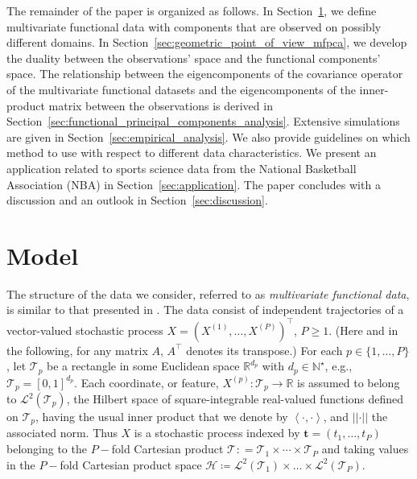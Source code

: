 \documentclass[times,sort&compress,3p]{elsarticle}
\theoremstyle{plain}%
\theoremstyle{definition}
\newcommand{\RR}{\mathbb{R}} %
\newcommand{\NN}{\mathbb{N}} %
\newcommand{\TT}[1]{\mathcal{T}_{#1}} %
\newcommand{\sLp}[1]{\mathcal{L}^{2}(#1)} %
\newcommand{\HH}{\mathcal{H}} %
\newcommand{\pointt}{\mathbf{t}} %
\newcommand{\inLp}[2]{\left\langle#1, #2\right\rangle} %
\newcommand{\normLp}[1]{\left|\left|#1\right|\right|} %
\newcommand{\Xp}[1]{X^{(#1)}} %
\begin{document}
The remainder of the paper is organized as follows. In Section~\ref{sec:model}, we define multivariate functional data with components that are observed on possibly different domains. In Section~\ref{sec:geometric_point_of_view_mfpca}, we develop the duality between the observations' space and the functional components' space. The relationship between the eigencomponents of the covariance operator of the multivariate functional datasets and the eigencomponents of the inner-product matrix between the observations is derived in Section~\ref{sec:functional_principal_components_analysis}. Extensive simulations are given in Section~\ref{sec:empirical_analysis}. We also provide guidelines on which method to use with respect to different data characteristics. We present an application related to sports science data from the National Basketball Association (NBA) in Section~\ref{sec:application}. The paper concludes with a discussion and an outlook in Section~\ref{sec:discussion}.


\section{Model} %
\label{sec:model}

The structure of the data we consider, referred to as \emph{multivariate functional data}, is similar to that presented in \cite{happMultivariateFunctionalPrincipal2018a}. The data consist of independent trajectories of a vector-valued stochastic process $X = (\Xp{1}, \dots, \Xp{P})^\top$, $P\geq 1$. (Here and in the following, for any matrix $A$, $A^\top$ denotes its transpose.) For each $p \in \{1, \dots, P\}$, let $\TT{p}$ be a rectangle in some Euclidean space $\RR^{d_p}$ with $d_p \in \NN^\star$, e.g., $\TT{p} = [0,1]^{d_p}$. Each coordinate, or feature, $X^{(p)} : \TT{p} \rightarrow \RR$ is assumed to belong to  $\sLp{\TT{p}}$, the Hilbert space of square-integrable real-valued functions defined on $\TT{p}$, having the usual inner product that we denote by $\inLp{\cdot}{\cdot}$, and $\normLp{\cdot}$ the associated norm. Thus $X$ is a stochastic process indexed by $\pointt = (t_1, \ldots, t_P)$ belonging to the $P-$fold Cartesian product $\TT{} : =\TT{1} \times \cdots \times \TT{P}$ and taking values in the $P-$fold Cartesian product space $\HH \coloneqq \sLp{\TT{1}} \times \dots \times \sLp{\TT{P}}$. 
\end{document}
